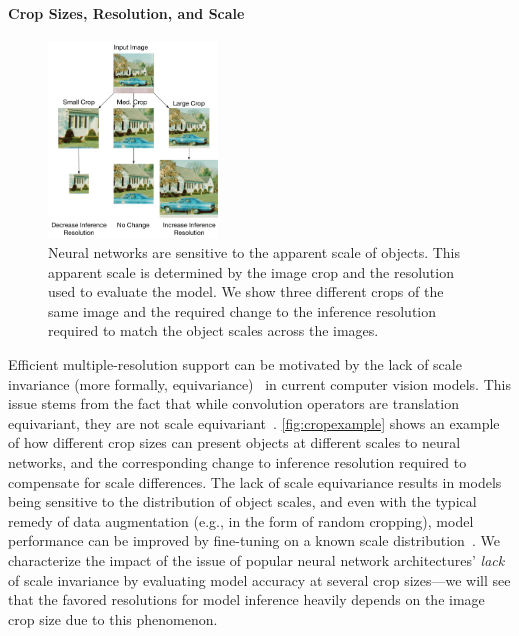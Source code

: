 \paragraph{Crop Sizes, Resolution, and Scale}
\label{sec:invariance}
\begin{figure}
    \centering
    \includegraphics[width=0.4\textwidth]{e2e_diagrams/scale variations.pdf}
\caption{Neural networks are sensitive to the apparent scale of objects. This apparent scale is determined by the image crop and the resolution used to evaluate the model. We show three different crops of the same image and the required change to the inference resolution required to match the object scales across the images.}
    \label{fig:cropexample}
\end{figure}
Efficient multiple-resolution support can be motivated by the lack of scale invariance (more formally, equivariance)~\cite{sosnovik2019scaleequivariant} in current computer vision models.
This issue stems from the fact that while convolution operators are translation equivariant, they are not scale equivariant~\cite{touvron2019fixing}.
\autoref{fig:cropexample} shows an example of how different crop sizes can present objects at different scales to neural networks, and the corresponding change to inference resolution required to compensate for scale differences.
The lack of scale equivariance results in models being sensitive to the distribution of object scales, and even with the typical remedy of data augmentation (e.g., in the form of random cropping), model performance can be improved by fine-tuning on a known scale distribution~\cite{touvron2019fixing}.
We characterize the impact of the issue of popular neural network architectures' \emph{lack} of scale invariance by evaluating model accuracy at several crop sizes---we will see that the favored resolutions for model inference heavily depends on the image crop size due to this phenomenon.


